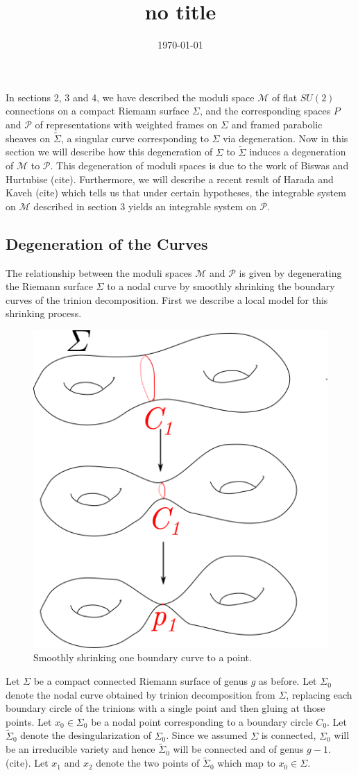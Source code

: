 \documentclass[]{article}
\title{no title}
\date{\today}
\newcommand{\MM}{\mathcal{M}}
\newcommand{\cP}{\mathcal{P}}
\begin{document}
	In sections 2, 3 and 4, we have described the moduli space $\MM$ of flat $SU(2)$ connections on a compact Riemann surface $\Sigma$, and the corresponding spaces $P$ and $\cP$ of representations with weighted frames on $\Sigma$ and framed parabolic sheaves on $\tilde{\Sigma}$, a singular curve corresponding to $\Sigma$ via degeneration. Now in this section we will describe how this degeneration of $\Sigma$ to $\tilde{\Sigma}$ induces a degeneration of $\MM$ to $\cP$. This degeneration of moduli spaces is due to the work of Biswas and Hurtubise (cite). Furthermore, we will describe a recent result of Harada and Kaveh (cite) which tells us that under certain hypotheses, the integrable system on $\MM$ described in section 3 yields an integrable system on $\cP$.
\subsection{Degeneration of the Curves}
	The relationship between the moduli spaces $\MM$ and $\cP$ is given by degenerating the Riemann surface $\Sigma$ to a nodal curve by smoothly shrinking the boundary curves of the trinion decomposition. First we describe a local model for this shrinking process.
	
	\begin{figure}[h]
		\centering
		\includegraphics[width=0.6\linewidth]{degen1pt}
		\caption{Smoothly shrinking one boundary curve to a point.}
		\label{fig:degen}
	\end{figure}
	
	Let $\Sigma$ be a compact connected Riemann surface of genus $g$ as before. Let $\Sigma_0$ denote the nodal curve obtained by trinion decomposition from $\Sigma$, replacing each boundary circle of the trinions with a single point and then gluing at those points. Let $x_0 \in \Sigma_0$ be a nodal point corresponding to a boundary circle $C_0$. Let $\tilde{\Sigma}_0$ denote the desingularization of $\Sigma_0$. Since we assumed $\Sigma$ is connected, $\Sigma_0$ will be an irreducible variety and hence $\tilde{\Sigma}_0$ will be connected and of genus $g-1$. (cite). Let $x_1$ and $x_2$ denote the two points of $\tilde{\Sigma}_0$ which map to $x_0 \in \Sigma$. 
	
\end{document}
